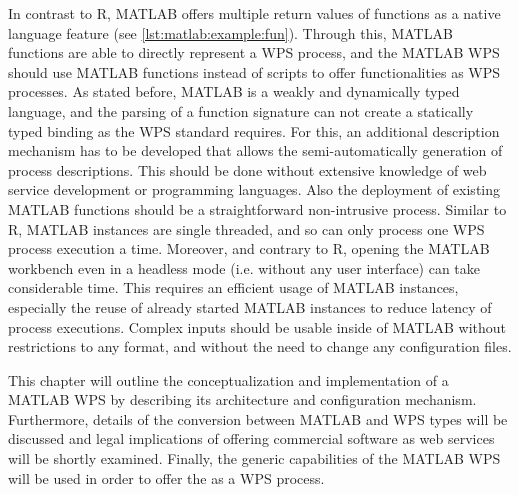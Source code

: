 In contrast to R, MATLAB offers multiple return values of functions as a native language feature (see \cref{lst:matlab:example:fun}). Through this, MATLAB functions are able to directly represent a \ac{WPS} process, and the MATLAB WPS should use MATLAB functions instead of scripts to offer functionalities as WPS processes. As stated before, MATLAB is a weakly and dynamically typed language, and the parsing of a function signature can not create a statically typed binding as the \ac{WPS} standard requires. For this, an additional description mechanism has to be developed that allows the semi-automatically generation of process descriptions. This should be done without extensive knowledge of web service development or programming languages. Also the deployment of existing MATLAB functions should be a straightforward non-intrusive process. Similar to R, MATLAB instances are single threaded, and so can only process one WPS process execution a time. Moreover, and contrary to R, opening the MATLAB workbench even in a headless mode (i.e. without any user interface) can take considerable time. This requires an efficient usage of MATLAB instances, especially the reuse of already started MATLAB instances to reduce latency of process executions. Complex inputs should be usable inside of MATLAB without restrictions to any format, and without the need to change any configuration files.



This chapter will outline the conceptualization and implementation of a MATLAB WPS by describing its architecture and configuration mechanism. Furthermore, details of the conversion between MATLAB and WPS types will be discussed and legal implications of offering commercial software as web services will be shortly examined. Finally, the generic capabilities of the MATLAB WPS will be used in order to offer the \la as a WPS process.

